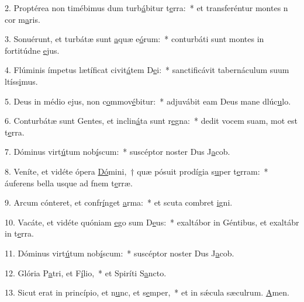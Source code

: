 2. Proptérea non timébimus dum turb\uline{á}bitur t\uline{e}rra:~* et transferéntur montes n cor m\uline{a}ris.\par 
3. Sonuérunt, et turbátæ sunt \uline{a}quæ e\uline{ó}rum:~* conturbáti sunt montes in fortitúdne \uline{e}jus.\par 
4. Flúminis ímpetus lætíficat civit\uline{á}tem D\uline{e}i:~* sanctificávit tabernáculum suum ltíss\uline{i}mus.\par 
5. Deus in médio ejus, non c\uline{o}mmov\uline{é}bitur:~* adjuvábit eam Deus mane dlúc\uline{u}lo.\par 
6. Conturbátæ sunt Gentes, et inclin\uline{á}ta sunt r\uline{e}gna:~* dedit vocem suam, mot est t\uline{e}rra.\par 
7. Dóminus virt\uline{ú}tum nob\uline{í}scum:~* suscéptor noster Dus J\uline{a}cob.\par 
8. Veníte, et vidéte ópera \uline{Dó}mini,~† quæ pósuit prodígia s\uline{u}per t\uline{e}rram:~* áuferens bella usque ad fnem t\uline{e}rræ.\par 
9. Arcum cónteret, et confr\uline{í}nget \uline{a}rma:~* et scuta combret \uline{i}gni.\par 
10. Vacáte, et vidéte quóniam \uline{e}go sum D\uline{e}us:~* exaltábor in Géntibus, et exaltábr in t\uline{e}rra.\par 
11. Dóminus virt\uline{ú}tum nob\uline{í}scum:~* suscéptor noster Dus J\uline{a}cob.\par 
12. Glória P\uline{a}tri, et F\uline{í}lio,~* et Spiríti S\uline{a}ncto.\par 
13. Sicut erat in princípio, et n\uline{u}nc, et s\uline{e}mper,~* et in sǽcula sæculrum. \uline{A}men.\par 
